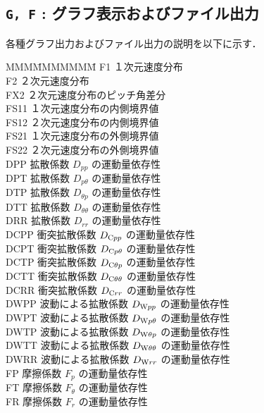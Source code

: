 \documentclass[11pt]{jarticle}
\begin{document}
\subsection{{\tt G, F} : グラフ表示およびファイル出力}
各種グラフ出力およびファイル出力の説明を以下に示す．
   \begin{tabbing}
MMM\=MMMMMMM\=\kill
\> F1   \>１次元速度分布\\
\> F2   \>２次元速度分布\\
\> FX2  \>２次元速度分布のピッチ角差分\\
\> FS11 \>１次元速度分布の内側境界値\\
\> FS12 \>２次元速度分布の内側境界値\\
\> FS21 \>１次元速度分布の外側境界値\\
\> FS22 \>２次元速度分布の外側境界値\\
\> DPP  \>拡散係数 $D_{pp}$ の運動量依存性\\
\> DPT  \>拡散係数 $D_{p\theta}$ の運動量依存性\\
\> DTP  \>拡散係数 $D_{\theta p}$ の運動量依存性\\
\> DTT  \>拡散係数 $D_{\theta\theta}$ の運動量依存性\\
\> DRR  \>拡散係数 $D_{rr}$ の運動量依存性\\
\> DCPP \>衝突拡散係数 $D_{\mathrm{C}pp}$ の運動量依存性\\
\> DCPT \>衝突拡散係数 $D_{\mathrm{C}p\theta}$ の運動量依存性\\
\> DCTP \>衝突拡散係数 $D_{\mathrm{C}\theta p}$ の運動量依存性\\
\> DCTT \>衝突拡散係数 $D_{\mathrm{C}\theta\theta}$ の運動量依存性\\
\> DCRR \>衝突拡散係数 $D_{\mathrm{C}rr}$ の運動量依存性\\
\> DWPP \>波動による拡散係数 $D_{\mathrm{W}pp}$ の運動量依存性\\
\> DWPT \>波動による拡散係数 $D_{\mathrm{W}p\theta}$ の運動量依存性\\
\> DWTP \>波動による拡散係数 $D_{\mathrm{W}\theta p}$ の運動量依存性\\
\> DWTT \>波動による拡散係数 $D_{\mathrm{W}\theta\theta}$ の運動量依存性\\
\> DWRR \>波動による拡散係数 $D_{\mathrm{W}rr}$ の運動量依存性\\
\> FP   \>摩擦係数 $F_{p}$ の運動量依存性\\
\> FT   \>摩擦係数 $F_{\theta}$ の運動量依存性\\
\> FR   \>摩擦係数 $F_{r}$ の運動量依存性\\

\end{tabbing}
\end{document}
